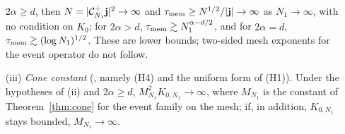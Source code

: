 \begin{theorem}
\begin{enumerate}
$2\alpha\ge d$, then $N=|\Cop_{N_1}^+\jj|^2\to\infty$ and $\tmem\ge N^{1/2}/|\jj|\to\infty$ as
$N_1\to\infty$, with no condition on $K_0$; for $2\alpha>d$, $\tmem\gtrsim N_1^{\alpha-d/2}$, and for
$2\alpha=d$, $\tmem\gtrsim(\log N_1)^{1/2}$. These are lower bounds; two-sided mesh exponents for the
event operator do not follow.
\item[(iii)] \emph{Cone constant} (, namely (H4) and the uniform form
of (H1)). Under the hypotheses of (ii) and $2\alpha\ge d$, $M_{N_1}^2K_{0,N_1}\to\infty$, where $M_{N_1}$ is the constant of
Theorem~\ref{thm:cone} for the event family on the mesh; if, in addition, $K_{0,N_1}$ stays bounded,
$M_{N_1}\to\infty$.
\end{enumerate}
\end{theorem}

